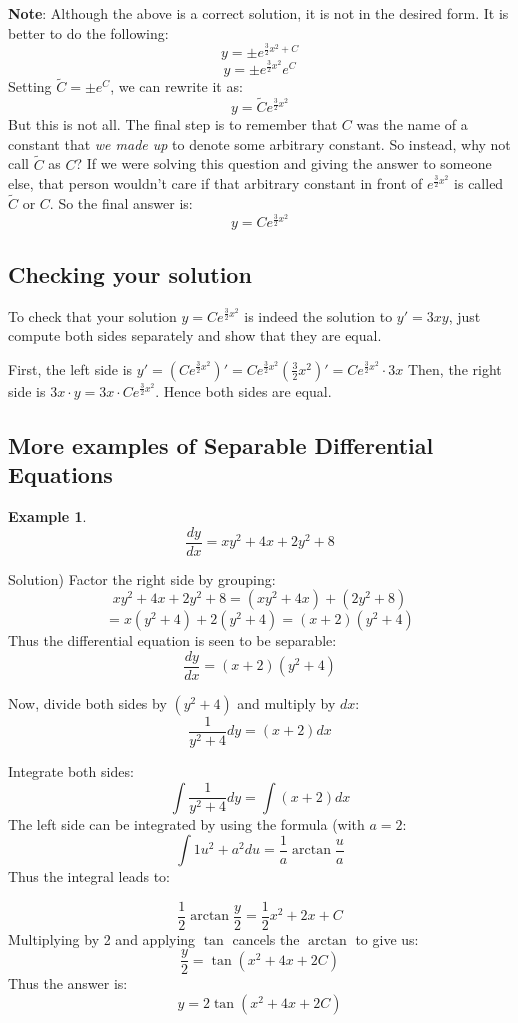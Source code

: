 \documentclass[12pt]{report}
\newtheorem{ex}{Example}[section]
\begin{document}
\textbf{Note}: Although the above is a correct solution, it is not in the desired form. It is better to do the following:
$$ y = \pm e^{\frac{3}{2} x^2 + C}$$
$$ y = \pm e^{\frac{3}{2} x^2} e^C$$
Setting $\tilde{C} = \pm e^C$, we can rewrite it as:
$$ y = \tilde{C} e^{\frac{3}{2} x^2}$$
But this is not all. The final step is to remember that $C$ was the name of a constant that \textit{we made up} to denote some arbitrary constant. So instead, why not call $\tilde{C}$ as $C$? If we were solving this question and giving the answer to someone else, that person wouldn't care if that arbitrary constant in front of $e^{\frac{3}{2} x^2}$ is called $\tilde{C}$ or $C$. So the final answer is:
$$ y = C e^{\frac{3}{2} x^2}$$

\subsection*{Checking your solution}
To check that your solution $ y = C e^{\frac{3}{2} x^2}$ is indeed the solution to $y'=3xy$, just compute both sides separately and show that they are equal.

First, the left side is $y' = \left( C e^{\frac{3}{2} x^2} \right)' = C e^{\frac{3}{2} x^2} \left(  \frac{3}{2} x^2 \right)' = C e^{\frac{3}{2} x^2} \cdot 3x $
Then, the right side is $3x\cdot y = 3x \cdot C e^{\frac{3}{2} x^2}$. Hence both sides are equal.

\subsection*{More examples of Separable Differential Equations}
\begin{ex}
	$$\frac{dy}{dx}= xy^2 + 4x + 2y^2 + 8 $$
\end{ex}

Solution) Factor the right side by grouping:
$$ xy^2 + 4x + 2y^2 + 8 = (xy^2 + 4x) + (2y^2 + 8) $$
$$ = x(y^2 +4)+2(y^2+4)=(x+2)(y^2+4) $$
Thus the differential equation is seen to be separable:
$$\frac{dy}{dx}= (x+2)(y^2+4) $$

Now, divide both sides by $(y^2+4)$ and multiply by $dx$:
$$\frac{1}{y^2+4} dy = (x+2)dx $$

Integrate both sides:
$$\int \frac{1}{y^2+4} dy = \int (x+2)dx $$
The left side can be integrated by using the formula (with $a=2$:
$$\int{1}{u^2+a^2} du = \frac{1}{a} \arctan{\frac{u}{a}} $$
Thus the integral leads to:

$$\frac{1}{2} \arctan{\frac{y}{2}} = \frac{1}{2} x^2 + 2x +C $$
Multiplying by 2 and applying $\tan$ cancels the $\arctan$ to give us:
$$ \frac{y}{2} = \tan{(x^2 +4x +2C)} $$
Thus the answer is:
$$ y =2 \tan{(x^2 +4x +2C)} $$
\end{document}
